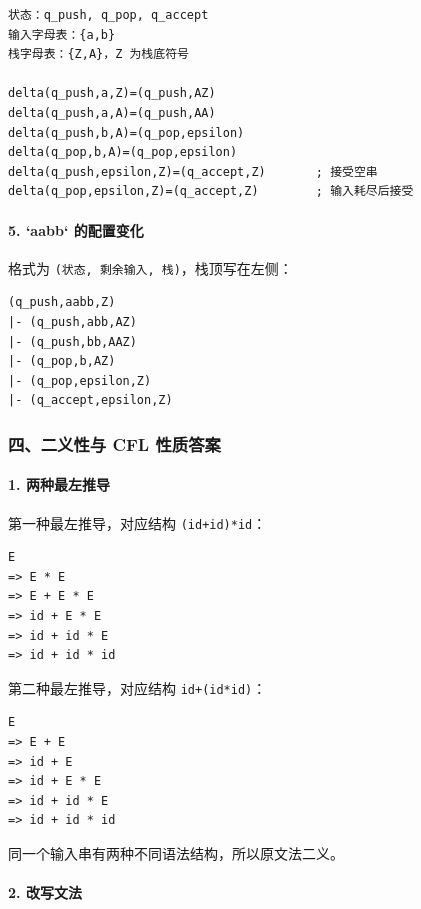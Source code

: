 \documentclass[UTF8]{ctexart}
\begin{document}
\begin{Verbatim}[fontsize=\small,breaklines=true]
状态：q_push, q_pop, q_accept
输入字母表：{a,b}
栈字母表：{Z,A}，Z 为栈底符号

delta(q_push,a,Z)=(q_push,AZ)
delta(q_push,a,A)=(q_push,AA)
delta(q_push,b,A)=(q_pop,epsilon)
delta(q_pop,b,A)=(q_pop,epsilon)
delta(q_push,epsilon,Z)=(q_accept,Z)       ; 接受空串
delta(q_pop,epsilon,Z)=(q_accept,Z)        ; 输入耗尽后接受
\end{Verbatim}

\paragraph*{5. `aabb` 的配置变化}

格式为 \texttt{(状态, 剩余输入, 栈)}，栈顶写在左侧：

\begin{Verbatim}[fontsize=\small,breaklines=true]
(q_push,aabb,Z)
|- (q_push,abb,AZ)
|- (q_push,bb,AAZ)
|- (q_pop,b,AZ)
|- (q_pop,epsilon,Z)
|- (q_accept,epsilon,Z)
\end{Verbatim}

\subsubsection*{四、二义性与 CFL 性质答案}

\paragraph*{1. 两种最左推导}

第一种最左推导，对应结构 \texttt{(id+id)*id}：

\begin{Verbatim}[fontsize=\small,breaklines=true]
E
=> E * E
=> E + E * E
=> id + E * E
=> id + id * E
=> id + id * id
\end{Verbatim}

第二种最左推导，对应结构 \texttt{id+(id*id)}：

\begin{Verbatim}[fontsize=\small,breaklines=true]
E
=> E + E
=> id + E
=> id + E * E
=> id + id * E
=> id + id * id
\end{Verbatim}

同一个输入串有两种不同语法结构，所以原文法二义。

\paragraph*{2. 改写文法}
\end{document}
